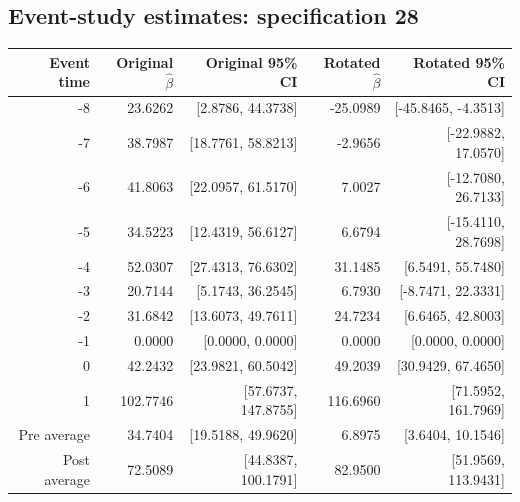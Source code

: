 \documentclass[10pt]{article}
\begin{document}
\subsection*{Event-study estimates: specification 28}
\begin{center}\scriptsize
\begin{tabular}{r rr rr}
\toprule
Event time & Original $\hat\beta$ & Original 95\% CI & Rotated $\hat\beta$ & Rotated 95\% CI \\
\midrule
-8 & 23.6262 & [2.8786, 44.3738] & -25.0989 & [-45.8465, -4.3513] \\
-7 & 38.7987 & [18.7761, 58.8213] & -2.9656 & [-22.9882, 17.0570] \\
-6 & 41.8063 & [22.0957, 61.5170] & 7.0027 & [-12.7080, 26.7133] \\
-5 & 34.5223 & [12.4319, 56.6127] & 6.6794 & [-15.4110, 28.7698] \\
-4 & 52.0307 & [27.4313, 76.6302] & 31.1485 & [6.5491, 55.7480] \\
-3 & 20.7144 & [5.1743, 36.2545] & 6.7930 & [-8.7471, 22.3331] \\
-2 & 31.6842 & [13.6073, 49.7611] & 24.7234 & [6.6465, 42.8003] \\
-1 & 0.0000 & [0.0000, 0.0000] & 0.0000 & [0.0000, 0.0000] \\
0 & 42.2432 & [23.9821, 60.5042] & 49.2039 & [30.9429, 67.4650] \\
1 & 102.7746 & [57.6737, 147.8755] & 116.6960 & [71.5952, 161.7969] \\
\midrule
Pre average & 34.7404 & [19.5188, 49.9620] & 6.8975 & [3.6404, 10.1546] \\
Post average & 72.5089 & [44.8387, 100.1791] & 82.9500 & [51.9569, 113.9431] \\
\bottomrule
\end{tabular}
\end{center}
\clearpage
\end{document}
